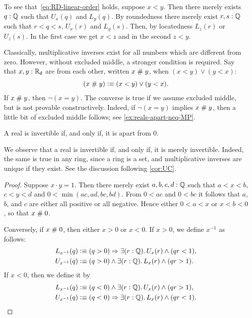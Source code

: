 To see that~\eqref{eq:RD-linear-order} holds, suppose $x < y$. Then there merely exists $q : \mathbb{Q}$ such that $U_x(q)$ and
$L_y(q)$. By roundedness there merely exist $r, s : \mathbb{Q}$ such that $r < q < s$, $U_x(r)$
and $L_y(s)$. Then, by locatedness $L_z(r)$ or $U_z(s)$. In the first case we get $x < z$
and in the second $z < y$.

Classically, multiplicative inverses exist for all numbers which are different from zero.
However, without excluded middle, a stronger condition is required. Say that $x, y : \mathbb{R}_\mathsf{d}$
are 
%
from each other, written $x \mathrel{\#} y$, when $(x < y) \lor (y < x)$:
%
\begin{equation*}
  (x \mathrel{\#} y) \vcentcolon\equiv (x < y) \lor (y < x).
\end{equation*}
%
If $x \mathrel{\#} y$, then $\lnot (x = y)$.
The converse is true if we assume excluded middle, but is not provable constructively.
%
Indeed, if $\lnot (x = y)$ implies $x\mathrel{\#} y$, then a little bit of excluded middle follows; see \cref{ex:reals-apart-neq-MP}.

\begin{thm} \label{RD-inverse-apart-0}
  A real is invertible if, and only if, it is apart from $0$.
\end{thm}

\begin{rmk}
  We observe that a real is invertible if, and only if, it is merely
  invertible.  Indeed, the same is true in any ring, since a ring is a set, and
  multiplicative inverses are unique if they exist.  See the discussion
  following \cref{cor:UC}.
\end{rmk}

\begin{proof}
  Suppose $x \cdot y = 1$. Then there merely exist $a, b, c, d : \mathbb{Q}$ such that
  $a < x < b$, $c < y < d$ and $0 < \min (a c, a d, b c, b d)$. From $0 < a c$ and $0 < b c$ it follows
  that $a$, $b$, and $c$ are either all positive or all negative.
  Hence either $0 < a < x$ or $x < b < 0$, so that $x \mathrel{\#} 0$.

  Conversely, if $x \mathrel{\#} 0$, then either $x > 0$ or $x < 0$.
  If $x > 0$, we define $x^{-1}$ as follows:
  \begin{align*}
    L_{x^{-1}}(q) &\defeq
    (q > 0) \Rightarrow \exis{r : \Q} U_x(r) \land (q r < 1),
    \\
    U_{x^{-1}}(q) &\defeq
    (q > 0) \land \exis{r : \Q} L_x(r) \land (q r > 1).
  \end{align*}
  If $x < 0$, then we define it by
  \begin{align*}
    L_{x^{-1}}(q) &\defeq
    (q < 0) \land \exis{r : \Q} U_x(r) \land (q r > 1),
    \\
    U_{x^{-1}}(q) &\defeq
    (q < 0) \Rightarrow \exis{r : \Q} L_x(r) \land (q r < 1). \qedhere
  \end{align*}
\end{proof}

